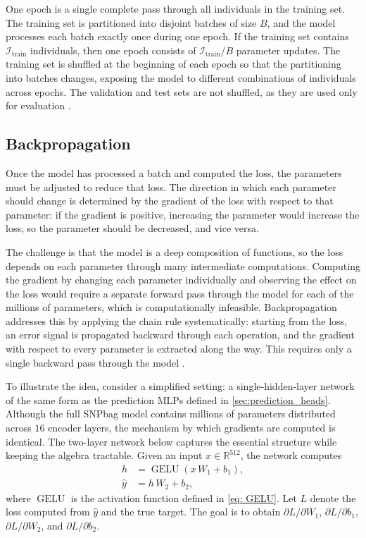 One epoch is a single complete pass through all individuals in the training
set. The training set is partitioned into disjoint batches of size $B$, and
the model processes each batch exactly once during one epoch. If the
training set contains $\mathcal{I}_{\mathrm{train}}$ individuals, then one
epoch consists of $\mathcal{I}_{\mathrm{train}} / B$ parameter updates. The
training set is shuffled at the beginning of each epoch so that the
partitioning into batches changes, exposing the model to different
combinations of individuals across epochs. The validation and test sets are
not shuffled, as they are used only for evaluation \citep{Goodfellow2016}.

\subsection{Backpropagation} \label{sec:backprop}
Once the model has processed a batch and computed the loss, the parameters must be adjusted to reduce that loss. The direction in which each parameter should change is determined by the gradient of the loss with respect to that parameter: if the gradient is positive, increasing the parameter would increase the loss, so the parameter should be decreased, and vice versa.

The challenge is that the model is a deep composition of functions, so the loss depends on each parameter through many intermediate computations. Computing the gradient by changing each parameter individually and observing the effect on the loss would require a separate forward pass through the model for each of the millions of parameters, which is computationally infeasible. Backpropagation addresses this by applying the chain rule systematically: starting from the loss, an error signal is propagated backward through each operation, and the gradient with respect to every parameter is extracted along the way. This requires only a single backward pass through the model \citep{Goodfellow2016}.

To illustrate the idea, consider a simplified setting: a single-hidden-layer network of the same form as the prediction MLPs defined in \autoref{sec:prediction_heads}. Although the full SNPbag model contains millions of parameters distributed across $16$ encoder layers, the mechanism by which gradients are computed is identical. The two-layer network below captures the essential structure while keeping the algebra tractable. Given an input $x \in \mathbb{R}^{512}$, the network computes
\begin{align*}
    h &= \operatorname{GELU}(x\, W_1 + b_1), \\
    \hat{y} &= h\, W_2 + b_2,
\end{align*}
where $\operatorname{GELU}$ is the activation function defined in \eqref{eq: GELU}. Let $L$ denote the loss computed from $\hat{y}$ and the true target. The goal is to obtain $\partial L / \partial W_1$, $\partial L / \partial b_1$, $\partial L / \partial W_2$, and $\partial L / \partial b_2$.

